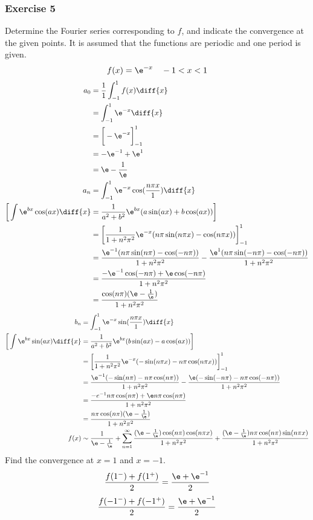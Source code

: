 \documentclass{math}
\begin{document}
\subsubsection*{Exercise 5}
Determine the Fourier series corresponding to \( f \), and indicate the
convergence at the given points. It is assumed that the functions are periodic
and one period is given.
\[ f(x) = \e^{-x} \quad -1<x<1 \]
\begin{align*}
  a_0 &= \frac{1}{1}\int_{-1}^{1}f(x)\diff{x} \\
  &= \int_{-1}^{1}\e^{-x}\diff{x} \\
  &= \bigg[-\e^{-x}\bigg]_{-1}^{1} \\
  &= -\e^{-1}+\e^{1} \\
  &= \e-\frac{1}{\e} \\
  a_n &= \int_{-1}^{1}\e^{-x}\cos(\frac{n\pi x}{1})\diff{x} \\
  \bigg[\int\e^{bx}\cos(ax)\diff{x} &=
    \frac{1}{a^2+b^2}\e^{bx}(a\sin(ax)+b\cos(ax))\bigg] \\
  &= \bigg[\frac{1}{1+n^2\pi^2}\e^{-x}(n\pi\sin(n\pi x)-
    \cos(n\pi x))\bigg]_{-1}^{1} \\
  &= \frac{\e^{-1}(n\pi\sin(n\pi)-\cos(-n\pi))}{1+n^2\pi^2}-
    \frac{\e^{1}(n\pi\sin(-n\pi)-\cos(-n\pi))}{1+n^2\pi^2} \\
  &= \frac{-\e^{-1}\cos(-n\pi)+\e\cos(-n\pi)}{1+n^2\pi^2} \\
  &= \frac{\cos(n\pi)(\e-\frac{1}{\e})}{1+n^2\pi^2}
\end{align*}
\begin{align*}
  b_n &= \int_{-1}^{1}\e^{-x}\sin(\frac{n\pi x}{1})\diff{x} \\
  \bigg[\int\e^{bx}\sin(ax)\diff{x} &=
    \frac{1}{a^2+b^2}\e^{bx}(b\sin(ax)-a\cos(ax))\bigg] \\
  &= \bigg[\frac{1}{1+n^2\pi^2}\e^{-x}(-\sin(n\pi x)-
    n\pi\cos(n\pi x))\bigg]_{-1}^{1} \\
  &= \frac{\e^{-1}(-\sin(n\pi)-n\pi\cos(n\pi))}{1+n^2\pi^2}-
    \frac{\e(-\sin(-n\pi)-n\pi\cos(-n\pi))}{1+n^2\pi^2} \\
  &= \frac{-e^{-1}n\pi\cos(n\pi)+\e n\pi\cos(n\pi)}{1+n^2\pi^2} \\
  &= \frac{n\pi\cos(n\pi)(\e-\frac{1}{\e})}{1+n^2\pi^2} \\
  f(x) &\sim \frac{1}{\e-\frac{1}{\e}}+\sum_{n=1}^{\infty}
    \frac{(\e-\frac{1}{\e})\cos(n\pi)\cos(n\pi x)}{1+n^2\pi^2}+
    \frac{(\e-\frac{1}{\e})n\pi\cos(n\pi)\sin(n\pi x)}{1+n^2\pi^2}
\end{align*}
Find the convergence at \( x = 1 \) and \( x = -1 \).
\[ \frac{f(1^-)+f(1^+)}{2} = \frac{\e+\e^{-1}}{2} \]
\[ \frac{f(-1^-)+f(-1^+)}{2} = \frac{\e+\e^{-1}}{2} \]
\end{document}
